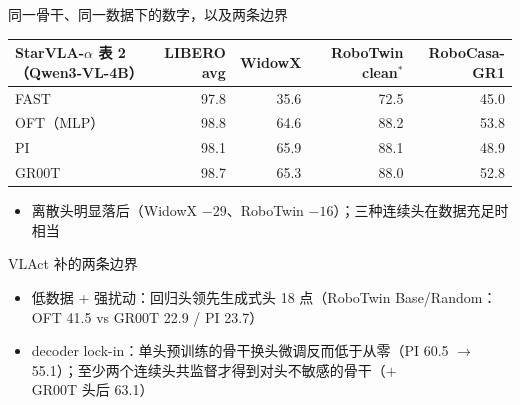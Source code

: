 \documentclass[aspectratio=169,10pt]{beamer}
\newcommand{\con}[1]{\textcolor{negative}{#1}}
\newcommand{\HL}[1]{\textcolor{emphasis}{#1}}
\begin{document}
\begin{frame}{同一骨干、同一数据下的数字，以及两条边界}
  \begin{center}\small
  \begin{tabular}{lrrrr}
    \toprule
    StarVLA-$\alpha$ 表 2（Qwen3-VL-4B） & LIBERO avg & WidowX & RoboTwin clean$^*$ & RoboCasa-GR1 \\
    \midrule
    FAST & 97.8 & \con{35.6} & \con{72.5} & 45.0 \\
    OFT（MLP） & 98.8 & 64.6 & 88.2 & \HL{53.8} \\
    PI & 98.1 & 65.9 & 88.1 & 48.9 \\
    GR00T & 98.7 & 65.3 & 88.0 & 52.8 \\
    \bottomrule
  \end{tabular}
  \end{center}
  \vspace{4pt}
  \begin{itemize}
    \item 离散头明显落后（WidowX $-29$、RoboTwin $-16$）；三种连续头在数据充足时相当
  \end{itemize}
  \begin{alertblock}{VLAct 补的两条边界}
    \begin{itemize}
      \item 低数据 + 强扰动：回归头领先生成式头 18 点（RoboTwin Base/Random：OFT 41.5 vs GR00T 22.9 / PI 23.7）
      \item decoder lock-in：单头预训练的骨干换头微调反而低于从零（PI 60.5 $\to$ 55.1）；至少两个连续头共监督才得到对头不敏感的骨干（$+$GR00T 头后 63.1）
    \end{itemize}
  \end{alertblock}
\end{frame}
\end{document}
